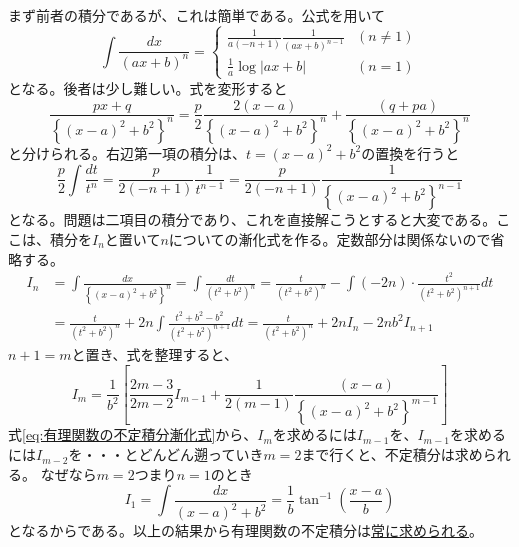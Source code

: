 \documentclass[a4j,dvipdfmx]{jsarticle}
\begin{document}
                まず前者の積分であるが、これは簡単である。公式を用いて
                \begin{equation}
                    \int \frac{dx}{(ax+b)^n} = \left\{\begin{array}{lc}
                        \displaystyle \frac{1}{a(-n+1)}\frac{1}{(ax+b)^{n-1}} & (n\neq 1) \\
                        \displaystyle \frac{1}{a}\log|ax+b| & (n=1)
                    \end{array}\right.
                \end{equation}
                となる。後者は少し難しい。式を変形すると
                \begin{equation*}
                    \frac{px+q}{\left\{(x-a)^2+b^2\right\}^n}=\frac{p}{2}\frac{2(x-a)}{\left\{(x-a)^2+b^2\right\}^n}+\frac{(q+pa)}{\left\{(x-a)^2+b^2\right\}^n}
                \end{equation*}
                と分けられる。右辺第一項の積分は、$t=(x-a)^2+b^2$の置換を行うと
                \begin{equation*}
                    \frac{p}{2}\int \frac{dt}{t^n}=\frac{p}{2(-n+1)}\frac{1}{t^{n-1}}=\frac{p}{2(-n+1)}\frac{1}{\left\{(x-a)^2+b^2\right\}^{n-1}}
                \end{equation*}
                となる。問題は二項目の積分であり、これを直接解こうとすると大変である。ここは、積分を$I_n$と置いて$n$についての漸化式を作る。定数部分は関係ないので省略する。
                \begin{align*}
                    I_n &= \int \frac{dx}{\left\{(x-a)^2+b^2\right\}^n}=\int \frac{dt}{(t^2+b^2)^n} = \frac{t}{(t^2+b^2)^n} - \int (-2n)\cdot\frac{t^2}{(t^2+b^2)^{n+1}}dt\\
                        &= \frac{t}{(t^2+b^2)^n}+2n\int \frac{t^2+b^2-b^2}{(t^2+b^2)^{n+1}}dt=\frac{t}{(t^2+b^2)^n}+2nI_n-2nb^2I_{n+1}
                \end{align*}
                $n+1=m$と置き、式を整理すると、
                \begin{equation}
                    I_m = \frac{1}{b^2}\left[\frac{2m-3}{2m-2}I_{m-1}+\frac{1}{2(m-1)}\frac{(x-a)}{\left\{(x-a)^2+b^2\right\}^{m-1}}\right] \label{eq:有理関数の不定積分漸化式}
                \end{equation}
                \clearpage
                式\eqref{eq:有理関数の不定積分漸化式}から、$I_m$を求めるには$I_{m-1}$を、$I_{m-1}$を求めるには$I_{m-2}$を・・・とどんどん遡っていき$m=2$まで行くと、不定積分は求められる。
                なぜなら$m=2$つまり$n=1$のとき
                \begin{equation*}
                    I_1 = \int \frac{dx}{(x-a)^2+b^2}=\frac{1}{b}\tan^{-1}\left(\frac{x-a}{b}\right) 
                \end{equation*}
                となるからである。以上の結果から有理関数の不定積分は\underline{常に求められる}。\\
\end{document}
